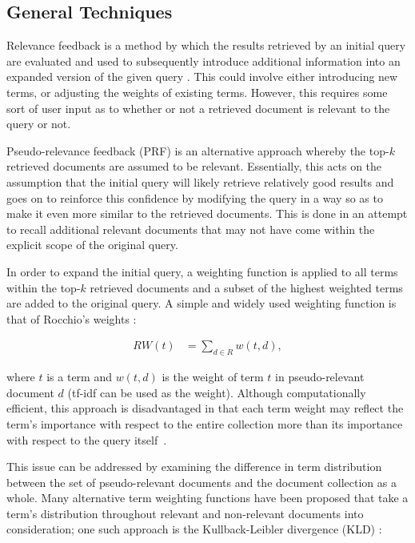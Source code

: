 \documentclass[a4paper]{report}
\begin{document}
\subsection{General Techniques}
  
Relevance feedback is a method by which the results retrieved by an initial query are evaluated and used to subsequently introduce additional information into an expanded version of the given query \citep{Carpineto:2012:SAQ:2071389.2071390}. This could involve either introducing new terms, or adjusting the weights of existing terms. However, this requires some sort of user input as to whether or not a retrieved document is relevant to the query or not. 

Pseudo-relevance feedback (PRF) is an alternative approach whereby the top-$k$ retrieved documents are assumed to be relevant. Essentially, this acts on the assumption that the initial query will likely retrieve relatively good results and goes on to reinforce this confidence by modifying the query in a way so as to make it even more similar to the retrieved documents. This is done in an attempt to recall additional relevant documents that may not have come within the explicit scope of the original query.

In order to expand the initial query, a weighting function is applied to all terms within the top-$k$ retrieved documents and a subset of the highest weighted terms are added to the original query. A simple and widely used weighting function is that of Rocchio's weights \cite{10020859664}:

\begin{equation}
\label{rocchiosweights}
\begin{split}
RW(t) &= \sum_{d\in R} w(t, d),
\end{split}
\end{equation}

where $t$ is a term and $w(t, d)$ is the weight of term $t$ in pseudo-relevant document $d$ (tf-idf can be used as the weight). Although computationally efficient, this approach is disadvantaged in that each term weight may reflect the term's importance with respect to the entire collection more than its importance with respect to the query itself~\citep{Carpineto:2012:SAQ:2071389.2071390}.

This issue can be addressed by examining the difference in term distribution between
the set of pseudo-relevant documents and the document collection as a whole. Many alternative term weighting functions have been proposed that take a term's distribution throughout relevant and non-relevant documents into consideration; one such approach is the Kullback-Leibler divergence (KLD) \cite{Carpineto:2001:IAA:366836.366860}:
\end{document}
